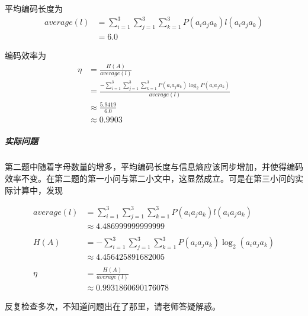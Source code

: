 \documentclass{ctexart}
\begin{document}
\begin{enumerate}
    平均编码长度为
    \begin{align}
        average(l) &= \sum_{i=1}^3\sum_{j=1}^3\sum_{k=1}^3 P(a_ia_ja_k)l(a_ia_ja_k) \\
        &= 6.0
    \end{align}

    编码效率为
    \begin{align}
        \eta &= \frac{H(A)}{average(l)} \\
        &= \frac{-\sum_{i=1}^3\sum_{j=1}^3\sum_{k=1}^3 P(a_ia_ja_k)\log_2 P(a_ia_ja_k)}{average(l)} \\
        &\approx \frac{5.9419}{6.0} \\
        &\approx 0.9903
    \end{align}
\end{enumerate}

\subparagraph{实际问题}

第二题中随着字母数量的增多，平均编码长度与信息熵应该同步增加，并使得编码效率不变。在第二题的第一小问与第二小文中，这显然成立。可是在第三小问的实际计算中，发现

\begin{align}
    average(l) &= \sum_{i=1}^3\sum_{j=1}^3\sum_{k=1}^3 P(a_ia_ja_k)l(a_ia_ja_k) \\
    &\approx 4.486999999999999 \\
    \\
    H(A) &= -\sum_{i=1}^3\sum_{j=1}^3\sum_{k=1}^3 P(a_ia_ja_k)\log_2(a_ia_ja_k) \\
    &\approx 4.456425891682005 \\
    \\
    \eta &= \frac{H(A)}{average(l)} \\
    &\approx 0.9931860690176078
\end{align}

反复检查多次，不知道问题出在了那里，请老师答疑解惑。
\end{document}
